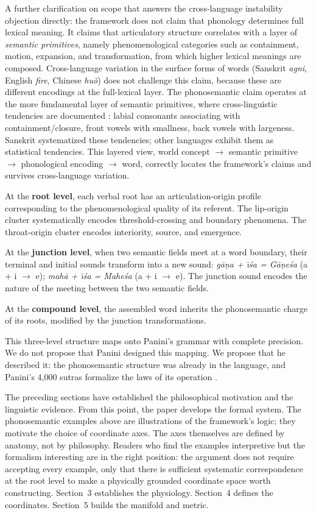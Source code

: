 \documentclass[12pt]{article}
\begin{document}
A further clarification on scope that answers the cross-language instability objection directly: the framework does not claim that phonology determines full lexical meaning. It claims that articulatory structure correlates with a layer of \textit{semantic primitives}, namely phenomenological categories such as containment, motion, expansion, and transformation, from which higher lexical meanings are composed. Cross-language variation in the surface forms of words (Sanskrit \textit{agni}, English \textit{fire}, Chinese \textit{hu\v{o}}) does not challenge this claim, because these are different encodings at the full-lexical layer. The phonosemantic claim operates at the more fundamental layer of semantic primitives, where cross-linguistic tendencies are documented \cite{blasi2016}: labial consonants associating with containment/closure, front vowels with smallness, back vowels with largeness. Sanskrit systematized these tendencies; other languages exhibit them as statistical tendencies. This layered view, world concept $\to$ semantic primitive $\to$ phonological encoding $\to$ word, correctly locates the framework's claims and survives cross-language variation.

At the \textbf{root level}, each verbal root has an articulation-origin profile corresponding to the phenomenological quality of its referent. The lip-origin cluster systematically encodes threshold-crossing and boundary phenomena. The throat-origin cluster encodes interiority, source, and emergence.

At the \textbf{junction level}, when two semantic fields meet at a word boundary, their terminal and initial sounds transform into a new sound: \textit{g\={a}\d{n}a + \={\i}\'{s}a = G\={a}\d{n}e\'{s}a} (a + i $\to$ e); \textit{mah\={a} + \={\i}\'{s}a = Mahe\'{s}a} (a + i $\to$ e). The junction sound encodes the nature of the meeting between the two semantic fields.

At the \textbf{compound level}, the assembled word inherits the phonosemantic charge of its roots, modified by the junction transformations.

This three-level structure maps onto Panini's grammar with complete precision. We do not propose that Panini designed this mapping. We propose that he described it: the phonosemantic structure was already in the language, and Panini's 4,000 sutras formalize the laws of its operation \cite{cardona1997, kiparsky1982}.

The preceding sections have established the philosophical motivation and the linguistic evidence. From this point, the paper develops the formal system. The phonosemantic examples above are illustrations of the framework's logic; they motivate the choice of coordinate axes. The axes themselves are defined by anatomy, not by philosophy. Readers who find the examples interpretive but the formalism interesting are in the right position: the argument does not require accepting every example, only that there is sufficient systematic correspondence at the root level to make a physically grounded coordinate space worth constructing. Section~3 establishes the physiology. Section~4 defines the coordinates. Section~5 builds the manifold and metric.
\end{document}
